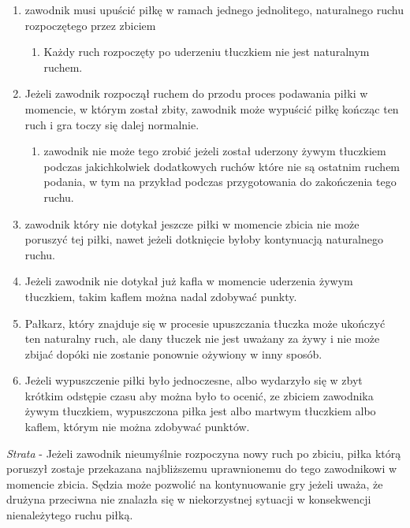 \documentclass[12pt]{article}
\begin{document}
\begin{enumerate}
\item
    zawodnik musi upuścić piłkę w ramach jednego jednolitego, naturalnego
  ruchu rozpoczętego przez zbiciem
  
  \begin{enumerate}
  \item
        Każdy ruch rozpoczęty po uderzeniu tłuczkiem nie jest naturalnym
    ruchem.
      \end{enumerate}
\item
  Jeżeli zawodnik rozpoczął ruchem do przodu proces podawania piłki w
  momencie, w którym został zbity, zawodnik może wypuścić piłkę kończąc
  ten ruch i gra toczy się dalej normalnie.

  \begin{enumerate}
  \item
        zawodnik nie może tego zrobić jeżeli został uderzony żywym tłuczkiem
    podczas jakichkolwiek dodatkowych ruchów które nie są ostatnim
    ruchem podania, w tym na przykład podczas przygotowania do
    zakończenia tego ruchu.
      \end{enumerate}
\item
    zawodnik który nie dotykał jeszcze piłki w momencie zbicia nie może
  poruszyć tej piłki, nawet jeżeli dotknięcie byłoby kontynuacją
  naturalnego ruchu.
  \item
    Jeżeli zawodnik nie dotykał już kafla w momencie uderzenia żywym
  tłuczkiem, takim kaflem można nadal zdobywać punkty.
  \item
  Pałkarz, który znajduje się w procesie upuszczania tłuczka może
  ukończyć ten naturalny ruch, ale dany tłuczek nie jest uważany za żywy
  i nie może zbijać dopóki nie zostanie ponownie ożywiony w inny sposób.
\item
    Jeżeli wypuszczenie piłki było jednoczesne, albo wydarzyło się w zbyt
  krótkim odstępie czasu aby można było to ocenić, ze zbiciem zawodnika
  żywym tłuczkiem, wypuszczona piłka jest albo martwym tłuczkiem albo
  kaflem, którym nie można zdobywać punktów.
  \end{enumerate}

\emph{Strata} - Jeżeli zawodnik nieumyślnie rozpoczyna nowy ruch po
zbiciu, piłka którą poruszył zostaje przekazana najbliższemu
uprawnionemu do tego zawodnikowi w momencie zbicia. Sędzia może pozwolić
na kontynuowanie gry jeżeli uważa, że drużyna przeciwna nie znalazła się
w niekorzystnej sytuacji w konsekwencji nienależytego ruchu piłką.
\end{document}
